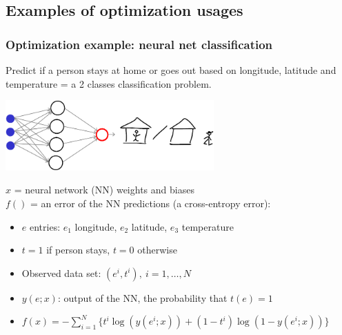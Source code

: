 \documentclass[12pt]{beamer}
\begin{document}
\subsection{Examples of optimization usages}

\begin{frame}
\frametitle{Optimization example: neural net classification}
\vspace{-0.3cm}
Predict if a person stays at home or goes out based on longitude, latitude and temperature = a 2 classes classification problem.
\begin{center}
\includegraphics[width=0.6\textwidth]{neuralnet3-4-1-classif-crop.pdf}\\
\vspace{-0.5cm}
\end{center}
$x$ = neural network (NN) weights and biases\\
$f()$ = an error of the NN predictions (a cross-entropy error):
\begin{itemize}
\item $e$ entries: $e_1$ longitude, $e_2$ latitude, $e_3$ temperature
\item $t=1$ if person stays, $t=0$ otherwise
\item Observed data set: $(e^i,t^i),~ i=1,\ldots,N$
\item $y(e;x)$: output of the NN, the probability that $t(e)=1$ 
\item $f(x) = - \sum_{i=1}^N \{ t^i \log(y(e^i;x)) + (1-t^i) \log(1 - y(e^i;x))\}$
\end{itemize}
\end{frame}
\end{document}

